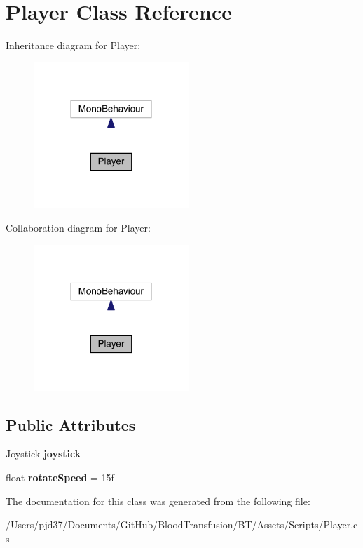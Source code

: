 \hypertarget{class_player}{}\section{Player Class Reference}
\label{class_player}


Inheritance diagram for Player\+:\nopagebreak
\begin{figure}[H]
\begin{center}
\leavevmode
\includegraphics[width=166pt]{class_player__inherit__graph}
\end{center}
\end{figure}


Collaboration diagram for Player\+:\nopagebreak
\begin{figure}[H]
\begin{center}
\leavevmode
\includegraphics[width=166pt]{class_player__coll__graph}
\end{center}
\end{figure}
\subsection*{Public Attributes}
\begin{DoxyCompactItemize}
\item 
Joystick {\bfseries joystick}\hypertarget{class_player_ae2eba4e1279332eedf1fdaadfd5ac883}{}\label{class_player_ae2eba4e1279332eedf1fdaadfd5ac883}

\item 
float {\bfseries rotate\+Speed} = 15f\hypertarget{class_player_a9cd7d533e7ab65ac4e68deafa4e9f11a}{}\label{class_player_a9cd7d533e7ab65ac4e68deafa4e9f11a}

\end{DoxyCompactItemize}


The documentation for this class was generated from the following file\+:\begin{DoxyCompactItemize}
\item 
/\+Users/pjd37/\+Documents/\+Git\+Hub/\+Blood\+Transfusion/\+B\+T/\+Assets/\+Scripts/Player.\+cs\end{DoxyCompactItemize}
